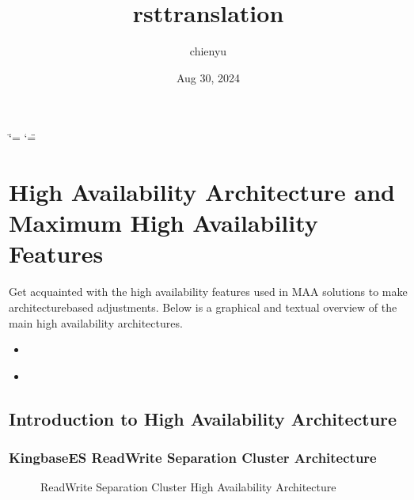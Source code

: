 \documentclass[letterpaper,10pt,english]{sphinxmanual}
\title{rst\sphinxhyphen{}translation}
\date{Aug 30, 2024}
\author{chienyu}
\begin{document}
\ifdefined\shorthandoff
  \ifnum\catcode`\=\string=\active\shorthandoff{=}\fi
  \ifnum\catcode`\"=\active{}\fi
\fi

\pagestyle{empty}
\sphinxmaketitle
\pagestyle{plain}
\sphinxtableofcontents
\pagestyle{normal}
\label{\detokenize{index::doc}}


\sphinxstepscope


\chapter{High Availability Architecture and Maximum High Availability Features}
\label{\detokenize{highly-availability-3-en:high-availability-architecture-and-maximum-high-availability-features}}\label{\detokenize{highly-availability-3-en:architectures}}\label{\detokenize{highly-availability-3-en::doc}}
\sphinxAtStartPar
Get acquainted with the high availability features used in MAA solutions to make architecture\sphinxhyphen{}based adjustments. Below is a graphical and textual overview of the main high availability architectures.
\begin{itemize}
\item {} 
\sphinxAtStartPar
{\hyperref[\detokenize{highly-availability-3-en:architectures}]{}}

\item {} 
\sphinxAtStartPar
{\hyperref[\detokenize{highly-availability-3-en:architectures}]{}}

\end{itemize}


\section{Introduction to High Availability Architecture}
\label{\detokenize{highly-availability-3-en:introduction-to-high-availability-architecture}}

\subsection{KingbaseES Read\sphinxhyphen{}Write Separation Cluster Architecture}
\label{\detokenize{highly-availability-3-en:kingbasees-read-write-separation-cluster-architecture}}
\begin{figure}[htbp]
\centering
\capstart

\noindent{}
\caption{Read\sphinxhyphen{}Write Separation Cluster High Availability Architecture}\label{\detokenize{highly-availability-3-en:id1}}\end{figure}
\end{document}
